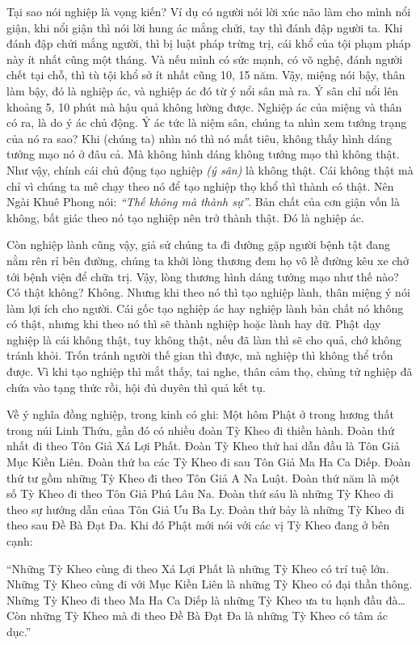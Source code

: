 \documentclass[
  12pt,
  oneside]{book}
\begin{document}
Tại sao nói nghiệp là vọng kiến? Ví dụ có người nói lời xúc não làm cho mình nổi giận, khi nổi giận thì nói lời hung ác mắng chửi, tay thì đánh đập người ta. Khi đánh đập chửi mắng người, thì bị luật pháp trừng trị, cái khổ của tội phạm pháp này ít nhất cũng một tháng. Và nếu mình có sức mạnh, có võ nghệ, đánh người chết tại chỗ, thì tù tội khổ sở ít nhất cũng 10, 15 năm. Vậy, miệng nói bậy, thân làm bậy, đó là nghiệp ác, và nghiệp ác đó từ ý nổi sân mà ra. Ý sân chỉ nổi lên khoảng 5, 10 phút mà hậu quả không lường được. Nghiệp ác của miệng và thân có ra, là do ý ác chủ động. Ý ác tức là niệm sân, chúng ta nhìn xem tướng trạng của nó ra sao? Khi (chúng ta) nhìn nó thì nó mất tiêu, không thấy hình dáng tướng mạo nó ở đâu cả. Mà không hình dáng không tướng mạo thì không thật. Như vậy, chính cái chủ động tạo nghiệp \emph{(ý sân)} là không thật. Cái không thật mà chỉ vì chúng ta mê chạy theo nó để tạo nghiệp thọ khổ thì thành có thật. Nên Ngài Khuê Phong nói: \emph{``Thế không mà thành sự''}. Bản chất của cơn giận vốn là không, bất giác theo nó tạo nghiệp nên trở thành thật. Đó là nghiệp ác.

Còn nghiệp lành cũng vậy, giả sử chúng ta đi đường gặp người bệnh tật đang nằm rên rỉ bên đường, chúng ta khởi lòng thương đem họ vô lề đường kêu xe chở tới bệnh viện để chữa trị. Vậy, lòng thương hình dáng tướng mạo như thế nào? Có thật không? Không. Nhưng khi theo nó thì tạo nghiệp lành, thân miệng ý nói làm lợi ích cho người. Cái gốc tạo nghiệp ác hay nghiệp lành bản chất nó không có thật, nhưng khi theo nó thì sẽ thành nghiệp hoặc lành hay dữ. Phật dạy nghiệp là cái không thật, tuy không thật, nếu đã làm thì sẽ cho quả, chớ không tránh khỏi. Trốn tránh người thế gian thì được, mà nghiệp thì không thể trốn được. Vì khi tạo nghiệp thì mắt thấy, tai nghe, thân cảm thọ, chủng tử nghiệp đã chứa vào tạng thức rồi, hội đủ duyên thì quả kết tụ.

Về ý nghĩa đồng nghiệp, trong kinh có ghi: Một hôm Phật ở trong hương thất trong núi Linh Thứu, gần đó có nhiều đoàn Tỳ Kheo đi thiền hành. Đoàn thứ nhất đi theo Tôn Giả Xá Lợi Phất. Đoàn Tỳ Kheo thứ hai dẫn đầu là Tôn Giả Mục Kiền Liên. Đoàn thứ ba các Tỳ Kheo đi sau Tôn Giả Ma Ha Ca Diếp. Đoàn thứ tư gồm những Tỳ Kheo đi theo Tôn Giả A Na Luật. Đoàn thứ năm là một số Tỳ Kheo đi theo Tôn Giả Phú Lâu Na. Đoàn thứ sáu là những Tỳ Kheo đi theo sự hướng dẫn củaa Tôn Giả Ưu Ba Ly. Đoàn thứ bảy là những Tỳ Kheo đi theo sau Đề Bà Đạt Đa. Khi đó Phật mới nói với các vị Tỳ Kheo đang ở bên cạnh:

``Những Tỳ Kheo cùng đi theo Xá Lợi Phất là những Tỳ Kheo có trí tuệ lớn. Những Tỳ Kheo cùng đi với Mục Kiền Liên là những Tỳ Kheo có đại thần thông. Những Tỳ Kheo đi theo Ma Ha Ca Diếp là những Tỳ Kheo ưa tu hạnh đầu đà\ldots{} Còn những Tỳ Kheo mà đi theo Đề Bà Đạt Đa là những Tỳ Kheo có tâm ác dục.''
\end{document}
